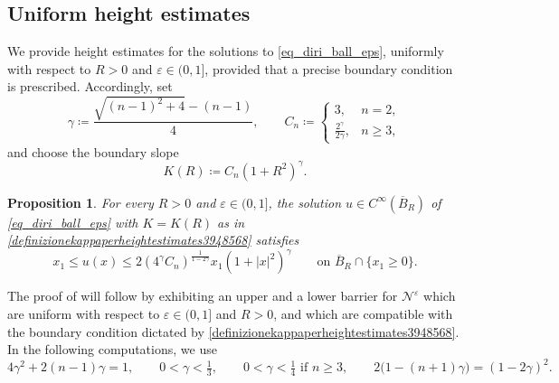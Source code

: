 \documentclass[11pt]{amsart}
\renewcommand{\leq}{\leqslant}
\renewcommand{\geq}{\geqslant}
\renewcommand{\ge}{>}
\newcommand{\eps}{\varepsilon}
\newcommand{\Ne}{\mathcal N^\eps}
\newtheorem{proposition}[theorem]{Proposition}
\theoremstyle{definition}
\theoremstyle{remark}
\numberwithin{equation}{section}
\begin{document}
\subsection{Uniform height estimates}\label{erfnjtrvijng}
We provide height estimates for the solutions to \eqref{eq_diri_ball_eps},
uniformly with respect to $R>0$ and $\eps\in(0,1]$, provided that a precise boundary condition is prescribed. Accordingly, set
\begin{equation}\label{defigammaecn}
     \gamma\coloneqq\frac{\sqrt{(n-1)^2+4}-(n-1)}4,
 \qquad
 C_n\coloneqq\begin{cases}3,&n=2,\\ \frac{2^\gamma}{2\gamma},&n\geq3,\end{cases}
\end{equation}
and choose the boundary slope
\begin{equation}\label{definizionekappaperheightestimates3948568}
 K(R)\coloneqq C_n(1+R^2)^\gamma.
\end{equation}
\begin{proposition}\label{propunistimamain3948573883derivata}
For every $R>0$ and $\eps\in(0,1]$,
the solution $u\in C^\infty(\overline B_R)$ of \eqref{eq_diri_ball_eps}
with $K=K(R)$ as in \eqref{definizionekappaperheightestimates3948568}
satisfies
\begin{equation}\label{uniformestimatesproprincheigh}
 x_1\leq u(x)\leq 2(4^\gamma C_n)^{\frac{1}{1-2\gamma}} x_1(1+|x|^2)^\gamma
 \qquad\text{on }\overline B_R\cap\{x_1\geq0\}.
\end{equation}
\end{proposition}
The proof of  will follow by exhibiting an upper and a lower barrier for $\Ne$ which are uniform with respect to $\eps\in(0,1]$ and $R\ge0$, and which are compatible with the boundary condition dictated by \eqref{definizionekappaperheightestimates3948568}. In the following computations, we use
\begin{equation}\label{eq:barrier-gamma}
 4\gamma^2+2(n-1)\gamma=1,\qquad
 0<\gamma<\tfrac13,\qquad 0<\gamma<\tfrac14\text{ if }n\geq 3,\qquad
 2\big(1-(n+1)\gamma\big)=(1-2\gamma)^2.
\end{equation}
\end{document}
